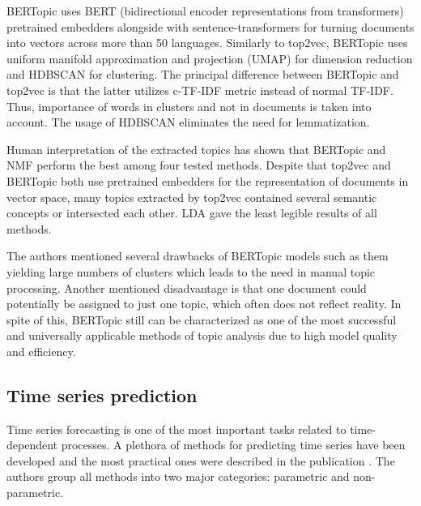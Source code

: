 \documentclass[3p,times,procedia]{elsarticle}
\begin{document}
BERTopic uses BERT (bidirectional encoder representations from transformers) pretrained embedders alongside with sentence-transformers for turning documents into vectors across more than 50 languages. Similarly to top2vec, BERTopic uses uniform manifold approximation and projection (UMAP) for dimension reduction and HDBSCAN for clustering. The principal difference between BERTopic and top2vec is that the latter utilizes c-TF-IDF metric instead of normal TF-IDF. Thus, importance of words in clusters and not in documents is taken into account. The usage of HDBSCAN eliminates the need for lemmatization.

Human interpretation of the extracted topics has shown that BERTopic and NMF perform the best among four tested methods. Despite that top2vec and BERTopic both use pretrained embedders for the representation of documents in vector space, many topics extracted by top2vec contained several semantic concepts or intersected each other. LDA gave the least legible results of all methods.

The authors mentioned several drawbacks of BERTopic models such as them yielding large numbers of clusters which leads to the need in manual topic processing. Another mentioned disadvantage is that one document could potentially be assigned to just one topic, which often does not reflect reality. In spite of this, BERTopic still can be characterized as one of the most successful and universally applicable methods of topic analysis due to high model quality and efficiency.

\subsection{Time series prediction} \label{tsp}

Time series forecasting is one of the most important tasks related to time-dependent processes. A plethora of methods for predicting time series have been developed and the most practical ones were described in the publication \cite{parmezan2019evaluation}. The authors group all methods into two major categories: parametric and non-parametric.
\end{document}

